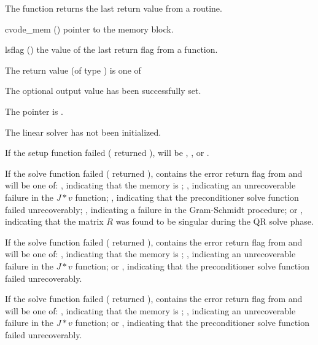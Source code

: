 {
  The function  returns the
  last return value from a {\cvspils} routine. 
}
{
  \begin{args}
  \item[cvode\_mem] ()
    pointer to the {\cvode} memory block.
  \item[lsflag] ()
    the value of the last return flag from a {\cvspils} function.
  \end{args}
}
{
  The return value  (of type ) is one of
  \begin{args}
  \item[\Id{CVSPILS\_SUCCESS}] 
    The optional output value has been successfully set.
  \item[\Id{CVSPILS\_MEM\_NULL}]
    The  pointer is .
  \item[\Id{CVSPILS\_LMEM\_NULL}]
    The {\cvspils} linear solver has not been initialized.
  \end{args}
}
{
  If the {\cvspils} setup function failed ( returned
  ),  will be ,
  , or .

  If the {\cvspgmr} solve function failed ( returned
  ),  contains the error return flag from
   and will be one of:
  , indicating that the {\spgmr} memory is ;
  , indicating an unrecoverable failure in the 
  $J*v$ function;
  , indicating that the preconditioner solve
  function  failed unrecoverably;
  , indicating a failure in the Gram-Schmidt procedure; 
  or , indicating that the matrix $R$ was found to be
  singular during the QR solve phase.

  If the {\cvspbcg} solve function failed ( returned
  ),  contains the error return flag from
   and will be one of:
  , indicating that the {\spbcg} memory is ;
  , indicating an unrecoverable failure in the 
  $J*v$ function; or
  , indicating that the preconditioner solve
  function  failed unrecoverably.

  If the {\cvsptfqmr} solve function failed ( returned
  ),  contains the error return flag from
   and will be one of:
  , indicating that the {\sptfqmr} memory is ;
  , indicating an unrecoverable failure in the 
  $J*v$ function; or
  , indicating that the preconditioner solve
  function  failed unrecoverably.
}
